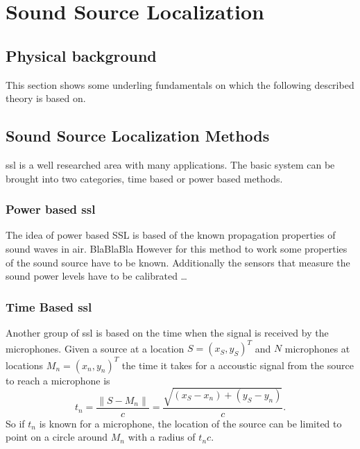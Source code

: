\graphicspath{ {images/2_source_localization/} }
\chapter{Sound Source Localization}
\section{Physical background}
This section shows some underling fundamentals on which the following described theory is based on.

\section{Sound Source Localization Methods}
\acrfull{ssl}  is a well researched area with many applications.
\cite{nat_skript}
The basic system can be brought into two categories, time based or power based methods.
\subsection{Power based \acrshort{ssl}}
The idea of power based SSL is based of the known propagation properties of sound waves in air.
BlaBlaBla 
However for this method to work some properties of the sound source have to be known.
Additionally the sensors that measure the sound power levels have to be calibrated \dots

\subsection{Time Based \acrshort{ssl}}
Another group of \acrshort*{ssl} is based on the time when the
signal is received by the microphones.
Given a source at a location $S = (x_S,y_S)^T$ and $N$ microphones at locations
$M_n = (x_n,y_n)^T$ the time it takes for a accoustic signal from the source to reach a microphone is
\begin{equation}
  t_n = \frac{\lVert S - M_n\rVert}{c}
  = \frac{\sqrt{\left(x_S - x_n\right) + \left(y_S - y_n\right)}}{c} .
\end{equation}
So if $t_n$ is known for a microphone, the location of the source can be limited to point on a circle
around $M_n$ with a radius of $t_n c$.

